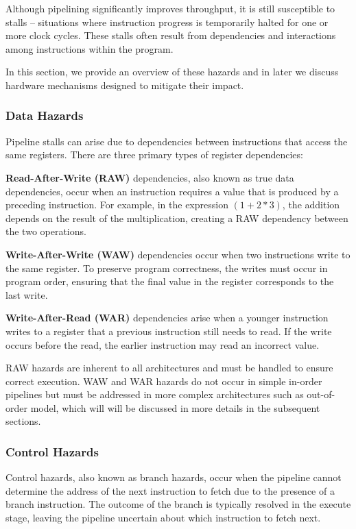 Although pipelining significantly improves throughput, it is still susceptible to stalls -- situations where instruction progress is temporarily halted for one or more clock cycles. These stalls often result from dependencies and interactions among instructions within the program. 

In this section, we provide an overview of these hazards and in later we discuss hardware mechanisms designed to mitigate their impact.

\subsubsection{Data Hazards}

Pipeline stalls can arise due to dependencies between instructions that access the same registers. There are three primary types of register dependencies:

\textbf{Read-After-Write (RAW)} dependencies, also known as true data dependencies, occur when an instruction requires a value that is produced by a preceding instruction. For example, in the expression $(1 + 2 * 3)$, the addition depends on the result of the multiplication, creating a RAW dependency between the two operations.

\textbf{Write-After-Write (WAW)} dependencies occur when two instructions write to the same register. To preserve program correctness, the writes must occur in program order, ensuring that the final value in the register corresponds to the last write.

\textbf{Write-After-Read (WAR)} dependencies arise when a younger instruction writes to a register that a previous instruction still needs to read. If the write occurs before the read, the earlier instruction may read an incorrect value.

RAW hazards are inherent to all architectures and must be handled to ensure correct execution. WAW and WAR hazards do not occur in simple in-order pipelines but must be addressed in more complex architectures such as out-of-order model, which will will be discussed in more details in the subsequent sections.

\subsubsection{Control Hazards}

Control hazards, also known as branch hazards, occur when the pipeline cannot determine the address of the next instruction to fetch due to the presence of a branch instruction. The outcome of the branch is typically resolved in the execute stage, leaving the pipeline uncertain about which instruction to fetch next.

